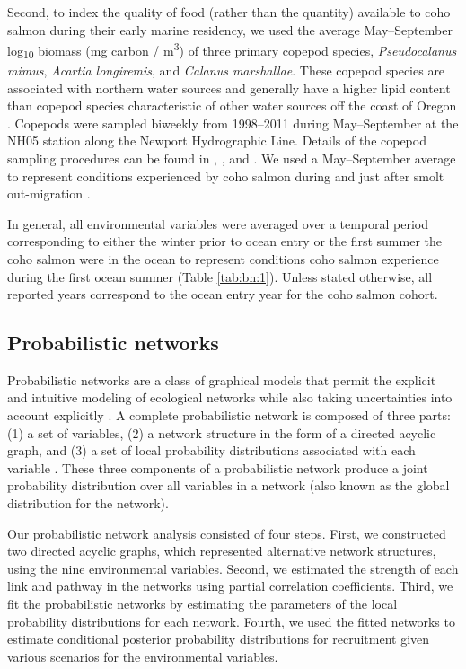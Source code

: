 Second, to index the quality of food (rather than the quantity) available to
coho salmon during their early marine residency, we used the average
May--September log\textsubscript{10} biomass (mg carbon / m\textsuperscript{3})
of three primary copepod species, \emph{Pseudocalanus mimus}, \emph{Acartia
longiremis}, and \emph{Calanus marshallae}. These copepod species are associated
with northern water sources and generally have a higher lipid content than
copepod species characteristic of other water sources off the coast of Oregon
\citep{Lee2006, Hooff2006a}. Copepods were sampled biweekly from 1998--2011
during May--September at the NH05 station along the Newport Hydrographic Line.
Details of the copepod sampling procedures can be found in \citet{Lamb2005a},
\citet{Peterson2003a}, and \citet{Bi2011b}.  We used a May--September average to
represent conditions experienced by coho salmon during and just after smolt
out-migration \citep{Bi2011a}.

In general, all environmental variables were averaged over a temporal period
corresponding to either the winter prior to ocean entry or the first summer the
coho salmon were in the ocean to represent conditions coho salmon experience
during the first ocean summer (Table \ref{tab:bn:1}). Unless stated otherwise,
all reported years correspond to the ocean entry year for the coho salmon
cohort.


\subsection{Probabilistic networks}

Probabilistic networks are a class of graphical models that permit the explicit
and intuitive modeling of ecological networks while also taking uncertainties
into account explicitly \citep{Pearl1988a, Varis1995a}. A complete probabilistic
network is composed of three parts: (1) a set of variables, (2) a network
structure in the form of a directed acyclic graph, and (3) a set of local
probability distributions associated with each variable \citep{Heckerman1996a}.
These three components of a probabilistic network produce a joint probability
distribution over all variables in a network (also known as the global
distribution for the network).

Our probabilistic network analysis consisted of four steps. First, we
constructed two directed acyclic graphs, which represented alternative network
structures, using the nine environmental variables. Second, we estimated the
strength of each link and pathway in the networks using partial correlation
coefficients. Third, we fit the probabilistic networks by estimating the
parameters of the local probability distributions for each network. Fourth, we
used the fitted networks to estimate conditional posterior probability
distributions for recruitment given various scenarios for the environmental
variables.


